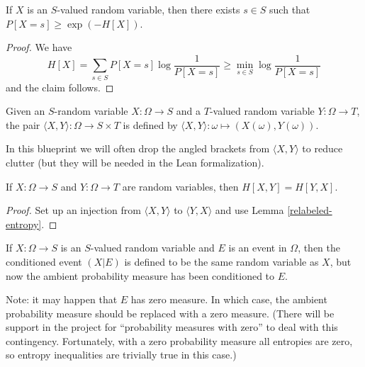 \begin{lemma}\label{bound-conc}
  If $X$ is an $S$-valued random variable, then there exists $s \in S$ such that $P[X=s] \geq \exp(-H[X])$.
\end{lemma}

\begin{proof}  We have
$$ H[X] = \sum_{s \in S} P[X=s] \log \frac{1}{P[X=s]} \geq \min_{s \in S} \log \frac{1}{P[X=s]}$$
and the claim follows.
\end{proof}

\begin{definition}\label{pair-def}
  \leanok
Given an $S$-random variable $X: \Omega \to S$ and a $T$-valued random variable $Y: \Omega \to T$, the pair $\langle X,Y \rangle: \Omega \to S \times T$ is defined by $\langle X, Y \rangle: \omega \mapsto (X(\omega), Y(\omega))$.
\end{definition}

In this blueprint we will often drop the angled brackets from $\langle X, Y \rangle$ to reduce clutter (but they will be needed in the Lean formalization).

\begin{lemma}\label{joint-symm}  If $X: \Omega \to S$ and $Y: \Omega \to T$ are random variables, then $H[X,Y ] = H[ Y,X]$.\end{lemma}

\begin{proof} Set up an injection from $\langle X,Y\rangle$ to $\langle Y,X\rangle$ and use Lemma \ref{relabeled-entropy}.
\end{proof}


\begin{definition}\label{condition-event-def}  If $X: \Omega \to S$ is an $S$-valued random variable and $E$ is an event in $\Omega$, then the conditioned event $(X|E)$ is defined to be the same random variable as $X$, but now the ambient probability measure has been conditioned to $E$.
\end{definition}

Note: it may happen that $E$ has zero measure.  In which case, the ambient probability measure should be replaced with a zero measure.  (There will be support in the project for ``probability measures with zero'' to deal with this contingency.  Fortunately, with a zero probability measure all entropies are zero, so entropy inequalities are trivially true in this case.)

